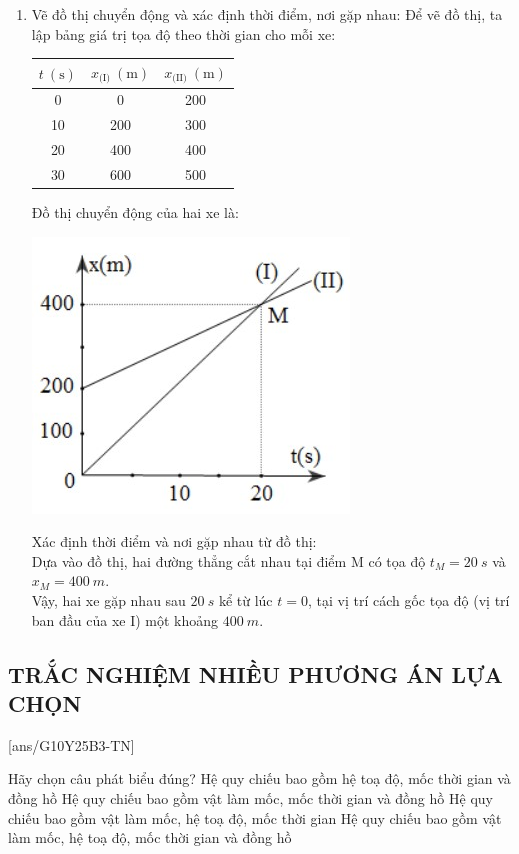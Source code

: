 \begin{vd}
{\begin{enumerate}[label=\alph*)]
			\item Vẽ đồ thị chuyển động và xác định thời điểm, nơi gặp nhau:
			Để vẽ đồ thị, ta lập bảng giá trị tọa độ theo thời gian cho mỗi xe:
			\begin{center}
				\begin{tabular}{|c|c|c|}
					\hline
					$t\ (\si{\second})$ & $x_{\text{(I)}}\ (\si{\meter})$ & $x_{\text{(II)}}\ (\si{\meter})$ \\
					\hline
					0 & 0 & 200 \\
					10 & 200 & 300 \\
					20 & 400 & 400 \\
					30 & 600 & 500 \\
					\hline
				\end{tabular}
			\end{center}
			Đồ thị chuyển động của hai xe là:
			\begin{center}
				\includegraphics[scale=0.8]{figs/G10Y25B3-23}
			\end{center}
			Xác định thời điểm và nơi gặp nhau từ đồ thị:\\
			Dựa vào đồ thị, hai đường thẳng cắt nhau tại điểm M có tọa độ $t_M=\SI{20}{s}$ và $x_M=\SI{400}{m}$.\\
			Vậy, hai xe gặp nhau sau $\SI{20}{s}$ kể từ lúc $t=0$, tại vị trí cách gốc tọa độ (vị trí ban đầu của xe I) một khoảng $\SI{400}{m}$.
		\end{enumerate}	
	}
\end{vd}
\subsection{TRẮC NGHIỆM NHIỀU PHƯƠNG ÁN LỰA CHỌN}
\setcounter{ex}{0}
[ans/G10Y25B3-TN]
\begin{ex}
	Hãy chọn câu phát biểu đúng?
	\choice
	{Hệ quy chiếu bao gồm hệ toạ độ, mốc thời gian và đồng hồ}
	{Hệ quy chiếu bao gồm vật làm mốc, mốc thời gian và đồng hồ}
	{Hệ quy chiếu bao gồm vật làm mốc, hệ toạ độ, mốc thời gian}
	{\True Hệ quy chiếu bao gồm vật làm mốc, hệ toạ độ, mốc thời gian và đồng hồ}
	\loigiai{
	}
\end{ex}

